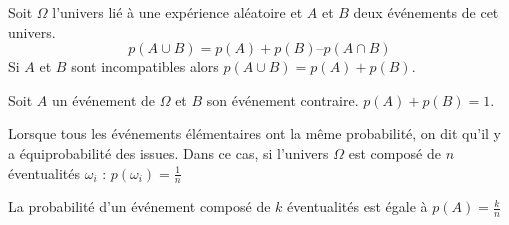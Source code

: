 \begin{Pp}
Soit $\Omega$ l'univers lié à une expérience aléatoire et $A$ et $B$ deux événements de cet univers.
$$p(A \cup B) = p(A) + p(B) – p(A \cap B)$$
Si $A$ et $B$ sont incompatibles alors $p(A \cup B) = p(A) + p(B)$.
\end{Pp}

\begin{Pp}
Soit $A$ un événement de $\Omega$ et $B$ son événement contraire. $p (A)+ p (B)=1$.
\end{Pp}
 

 

\begin{Pp}[Équiprobabilité]
Lorsque tous les événements élémentaires ont la même probabilité, on dit qu'il y a équiprobabilité des
issues.
Dans ce cas, si l'univers $\Omega$ est composé de $n$ éventualités $\omega_i$ : $p(\omega_i)=\frac{1}{n}$

La probabilité d'un événement composé de $k$ éventualités est égale à $p(A)=\frac{k}{n}$
\end{Pp}








 
 
